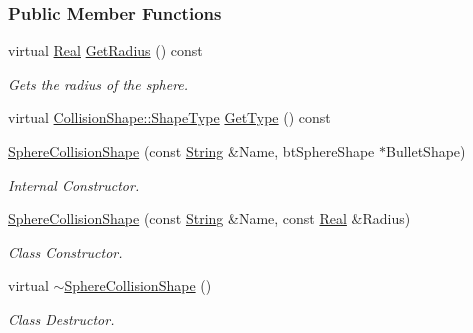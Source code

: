 \subsubsection*{Public Member Functions}
\begin{DoxyCompactItemize}
\item 
virtual \hyperlink{namespacephys_af7eb897198d265b8e868f45240230d5f}{Real} \hyperlink{classphys_1_1SphereCollisionShape_a2c7415d9d77d49b0370ddebbfe8974e5}{GetRadius} () const 
\begin{DoxyCompactList}\small\item\em Gets the radius of the sphere. \item\end{DoxyCompactList}\item 
virtual \hyperlink{classphys_1_1CollisionShape_af3ba4fd8af5b9557f912d2f5ff35a588}{CollisionShape::ShapeType} \hyperlink{classphys_1_1SphereCollisionShape_af1615df663ac26a029580b9a29a4bc09}{GetType} () const 
\item 
\hyperlink{classphys_1_1SphereCollisionShape_af4190f3e735f275998da3c38e2c3266b}{SphereCollisionShape} (const \hyperlink{namespacephys_aa03900411993de7fbfec4789bc1d392e}{String} \&Name, btSphereShape $\ast$BulletShape)
\begin{DoxyCompactList}\small\item\em Internal Constructor. \item\end{DoxyCompactList}\item 
\hyperlink{classphys_1_1SphereCollisionShape_a09d5650ceec4ba095abcb3f366ba3129}{SphereCollisionShape} (const \hyperlink{namespacephys_aa03900411993de7fbfec4789bc1d392e}{String} \&Name, const \hyperlink{namespacephys_af7eb897198d265b8e868f45240230d5f}{Real} \&Radius)
\begin{DoxyCompactList}\small\item\em Class Constructor. \item\end{DoxyCompactList}\item 
\hypertarget{classphys_1_1SphereCollisionShape_a5c9e6f3de9f6c911de347474c4bbb97e}{
virtual \hyperlink{classphys_1_1SphereCollisionShape_a5c9e6f3de9f6c911de347474c4bbb97e}{$\sim$SphereCollisionShape} ()}
\label{classphys_1_1SphereCollisionShape_a5c9e6f3de9f6c911de347474c4bbb97e}

\begin{DoxyCompactList}\small\item\em Class Destructor. \item\end{DoxyCompactList}\end{DoxyCompactItemize}

